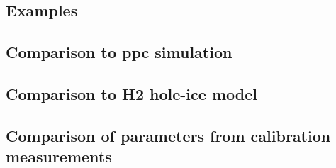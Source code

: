 \documentclass[green, 12pt]{beamer}
\begin{document}
\subsection{Examples}
  
  
  
  
  
  
  
  
  
  
%
%
%
%   
%
%   
%
%   
%
\subsection{Comparison to ppc simulation}
  
\subsection{Comparison to H2 hole-ice model}
  
\subsection{Comparison of parameters from calibration measurements}
  
\end{document}
